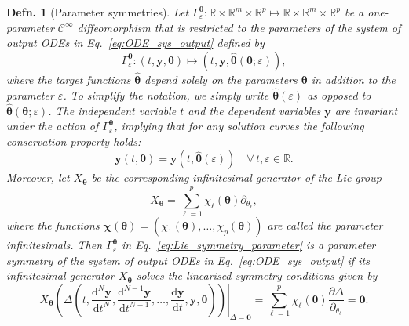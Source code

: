 \documentclass[12pt]{article}
\newtheorem{definition}{Defn.}
\begin{document}
\medskip
\begin{definition}[Parameter symmetries]
    Let $\Gamma^{\boldsymbol{\theta}}_{\varepsilon}:\mathbb{R}\times\mathbb{R}^{m}\times\mathbb{R}^{p}\mapsto\mathbb{R}\times\mathbb{R}^{m}\times\mathbb{R}^{p}$ be a one-parameter $\mathcal{C}^{\infty}$ diffeomorphism that is restricted to the parameters of the system of output ODEs in Eq.~\eqref{eq:ODE_sys_output} defined by
\begin{equation}
    \Gamma_{\varepsilon}^{\boldsymbol{\theta}}:(t,\mathbf{y},\boldsymbol{\theta})\mapsto\left(t,\mathbf{y},\hat{\boldsymbol{\theta}}(\boldsymbol{\theta};\varepsilon)\right),
    \label{eq:Lie_symmetry_parameter}
\end{equation}
where the target functions $\hat{\boldsymbol{\theta}}$ depend solely on the parameters $\boldsymbol{\theta}$ in addition to the parameter $\varepsilon$. To simplify the notation, we simply write $\hat{\boldsymbol{\theta}}(\varepsilon)$ as opposed to $\hat{\boldsymbol{\theta}}(\boldsymbol{\theta};\varepsilon)$. The independent variable $t$ and the dependent variables $\mathbf{y}$ are invariant under the action of $\Gamma_{\varepsilon}^{\boldsymbol{\theta}}$, implying that for any solution curves the following conservation property holds:
\begin{equation}
  \mathbf{y}(t,\boldsymbol{\theta})=\mathbf{y}(t,\hat{\boldsymbol{\theta}}(\varepsilon))\quad\forall\,t,\varepsilon\in\mathbb{R}.
  \label{eq:invariant_output}
\end{equation}
Moreover, let $X_{\boldsymbol{\theta}}$ be the corresponding infinitesimal generator of the Lie group
\begin{equation}
X_{\boldsymbol{\theta}}=\sum_{\ell=1}^{p}\chi_{\ell}(\boldsymbol{\theta})\partial_{\theta_{\ell}},
    \label{eq:X_parameter_1}
\end{equation}
where the functions $\boldsymbol{\chi}(\boldsymbol{\theta})=\left(\chi_{1}(\boldsymbol{\theta}),\ldots,\chi_{p}(\boldsymbol{\theta})\right)$ are called the \textit{parameter infinitesimals}. Then $\Gamma^{\boldsymbol{\theta}}_{\varepsilon}$ in Eq.~\eqref{eq:Lie_symmetry_parameter} is a \textit{parameter symmetry} of the system of output ODEs in Eq.~\eqref{eq:ODE_sys_output} if its infinitesimal generator $X_{\boldsymbol{\theta}}$ solves the linearised symmetry conditions given by
\begin{equation} \left.X_{\boldsymbol{\theta}}\left(\Delta\left(t,\frac{\mathrm{d}^{N}\mathbf{y}}{\mathrm{d}t^{N}},\frac{\mathrm{d}^{N-1}\mathbf{y}}{\mathrm{d}t^{N-1}},\ldots,\frac{\mathrm{d}\mathbf{y}}{\mathrm{d}t},\mathbf{y},\boldsymbol{\theta}\right)\right)\right|_{\Delta=\mathbf{0}}=\sum_{\ell=1}^{p}\chi_{\ell}(\boldsymbol{\theta})\frac{\partial\Delta}{\partial_{\theta_{\ell}}}=\mathbf{0}.
    \label{eq:lin_sym_parameter}
\end{equation}
    \label{def:parameter}
\end{definition}
\end{document}
